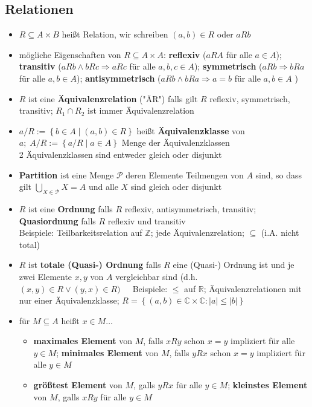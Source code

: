 \documentclass[10pt,a4paper]{article}
\begin{document}
\subsection{Relationen}
\begin{itemize}
\item $R\subseteq A\times B$ heißt Relation, wir schreiben $(a,b) \in R$ oder $aRb$
\item mögliche Eigenschaften von $R\subseteq A\times A$: \textbf{reflexiv} ($aRA$ für alle $a\in A$); \textbf{transitiv} ($aRb\land bRc \Rightarrow aRc$ für alle $a,b,c\in A$); \textbf{symmetrisch} ($aRb\Rightarrow bRa$ für alle $a,b \in A$); \textbf{antisymmetrisch} ($aRb\land bRa \Rightarrow a=b$ für alle $a,b\in A$ )
\item $R$ ist eine \textbf{Äquivalenzrelation} ("ÄR") falls gilt $R$ reflexiv, symmetrisch, transitiv; $R_{1}\cap R_{2}$ ist immer Äquivalenzrelation 
\item $a/R:=\left\lbrace b\in A\mid (a,b) \in R\right\rbrace$ heißt \textbf{Äquivalenzklasse} von $a;\; A/R:=\left\lbrace a/R\mid a\in A\right\rbrace$ Menge der Äquivalenzklassen  \\
2 Äquivalenzklassen sind entweder gleich oder disjunkt
\item \textbf{Partition} ist eine Menge $\mathcal{P}$ deren Elemente Teilmengen von $A$ sind, so dass gilt $\bigcup_{X\in \mathcal{P}} X=A$ und alle $X$ sind gleich oder disjunkt


\item $R$ ist eine \textbf{Ordnung} falls $R$ reflexiv, antisymmetrisch, transitiv; \textbf{Quasiordnung} falls $R$ reflexiv und transitiv\\
Beispiele: Teilbarkeitsrelation auf $\mathbb{Z}$; jede Äquivalenzrelation; $\subseteq$ (i.A. nicht total)
\item $R$ ist \textbf{totale (Quasi-) Ordnung} falls $R$ eine (Quasi-) Ordnung ist und je zwei Elemente $x,y$ von $A$ vergleichbar sind (d.h. $(x,y)\in R\lor (y,x)\in R)\;\;\;\;$ Beispiele: $\leq$ auf $\mathbb{R}$; Äquivalenzrelationen mit nur einer Äquivalenzklasse; $R=\left\lbrace (a,b) \in \mathbb{C}\times \mathbb{C}: \vert a\vert \leq \vert b \vert \right\rbrace$ 
\item für $M\subseteq A$ heißt $x\in M\dotsc$ 

\begin{itemize}
\item \textbf{maximales Element} von $M$, falls $xRy$ schon $x=y$ impliziert für alle $y\in M$; \textbf{minimales Element} von $M$, falls $yRx$ schon $x=y$ impliziert für alle $y\in M$
\item \textbf{größtest Element} von $M$, galls $yRx$ für alle $y\in M$; \textbf{kleinstes Element} von $M$, galls $xRy$ für alle $y\in M$ 
\end{itemize}


\end{itemize}
\end{document}
